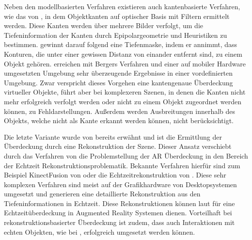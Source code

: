 Neben den modellbasierten Verfahren existieren auch kantenbasierte Verfahren, wie das von \citet{berger1997resolving}, in dem Objektkanten auf optischer Basis mit Filtern ermittelt werden. Diese Kanten werden über mehrere Bilder verfolgt, um die Tiefeninformation der Kanten durch Epipolargeometrie und Heuristiken zu bestimmen. \citet{berger1997resolving} gewinnt darauf folgend  eine Tiefenmaske, indem er annimmt, dass Konturen, die unter einer gewissen Distanz von einander entfernt sind, zu einem Objekt gehören. \citet{klein2004sensor} erreichen mit Bergers Verfahren und einer auf mobiler Hardware umgesetzten Umgebung sehr überzeugende Ergebnisse in einer vordefinierten Umgebung. Zwar verspricht dieses Vorgehen eine kantengenaue Überdeckung virtueller Objekte, führt aber bei komplexeren Szenen, in denen die Kanten nicht mehr erfolgreich verfolgt werden oder nicht zu einem Objekt zugeordnet werden können, zu Fehldarstellungen. Außerdem werden Ausbreitungen innerhalb des Objekts, welche nicht als Kante erkannt werden können, nicht berücksichtigt.

Die letzte Variante wurde von \citet{breen1996interactive} bereits erwähnt und ist die Ermittlung der Überdeckung durch eine Rekonstruktion der Szene. Dieser Ansatz verschiebt durch das Verfahren von \citet{wloka1995resolving} die Problemstellung der AR Überdeckung in den Bereich der Echtzeit Rekonstruktionsproblematik. Bekannte Verfahren hierfür sind zum Beispiel KinectFusion von \citet{newcombe2011kinectfusion} oder die Echtzeitrekonstruktion von \citet{niessner2013real}. Diese sehr komplexen Verfahren sind meist auf der Grafikhardware von Desktopsystemen umgesetzt und generieren eine detaillierte Rekonstruktion aus den Tiefeninformationen in Echtzeit. Diese Rekonstruktionen können laut \citet{newcombe2011kinectfusion} für eine Echtzeitüberdeckung in Augmented Reality Systemen dienen. Vorteilhaft bei rekonstruktionsbasierter Überdeckung ist zudem, dass auch Interaktionen mit echten Objekten, wie bei \citet{breen1996interactive}, erfolgreich umgesetzt werden können.


